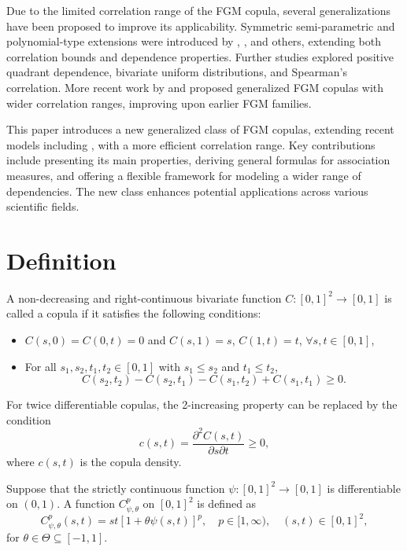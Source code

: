 \documentclass[twoside]{article}
\numberwithin{equation}{section}
\begin{document}
Due to the limited correlation range of the FGM copula, several generalizations have been proposed to improve its applicability. Symmetric semi-parametric and polynomial-type extensions were introduced by \cite{Rodriguez2004}, \cite{HuangKotz1999}, and others, extending both correlation bounds and dependence properties. Further studies explored positive quadrant dependence, bivariate uniform distributions, and Spearman's correlation. More recent work by \cite{Bekrizadeh2012, Bekrizadeh2015} and \cite{Pathak2016} proposed generalized FGM copulas with wider correlation ranges, improving upon earlier FGM families.

This paper introduces a new generalized class of FGM copulas, extending recent models including \cite{Bekrizadeh2012}, with a more efficient correlation range. Key contributions include presenting its main properties, deriving general formulas for association measures, and offering a flexible framework for modeling a wider range of dependencies. The new class enhances potential applications across various scientific fields.

\section{Definition}
A non-decreasing and right-continuous bivariate function $C: [0,1]^2 \to [0,1]$ is called a copula if it satisfies the following conditions:
\begin{itemize}
\item[P1.] $C(s,0)=C(0,t)=0$ and $C(s,1)=s$, $C(1,t)=t$, $\forall s,t \in [0,1]$,
\item[P2.] For all $s_1, s_2, t_1, t_2 \in [0,1]$ with $s_1 \le s_2$ and $t_1 \le t_2$,
\begin{equation}
C(s_2,t_2) - C(s_2,t_1) - C(s_1,t_2) + C(s_1,t_1) \ge 0.
\end{equation}
\end{itemize}
For twice differentiable copulas, the 2-increasing property can be replaced by the condition
\begin{equation}\label{eq2}
c(s,t) = \frac{\partial^2 C(s,t)}{\partial s \partial t} \ge 0,
\end{equation}
where $c(s,t)$ is the copula density.

\begin{dfn}\label{df1}
Suppose that the strictly continuous function $\psi: [0,1]^2 \to [0,1]$ is differentiable on $(0,1)$. A function $C_{\psi,\theta}^p$ on $[0,1]^2$ is defined as
\begin{equation}\label{eq3}
C_{\psi,\theta}^p(s,t) = st\left[1 + \theta \psi(s,t)\right]^p, \quad p \in [1, \infty), \quad (s,t) \in [0,1]^2,
\end{equation}
for $\theta \in \Theta \subseteq [-1, 1]$.
\end{dfn}
\end{document}
